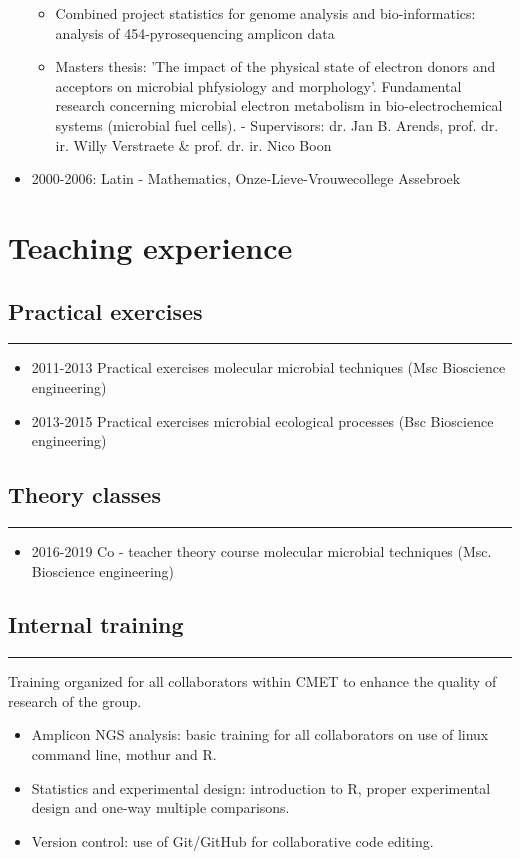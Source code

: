 \documentclass[a4paper,11pt,oneside]{article}
\begin{document}
\begin{itemize}
\begin{itemize}
		\item Combined project statistics for genome analysis and bio-informatics: analysis of 454-pyrosequencing amplicon data
		\item Masters thesis: 'The impact of the physical state of electron donors and acceptors on microbial phfysiology and morphology'. Fundamental research concerning microbial electron metabolism in bio-electrochemical systems (microbial fuel cells). - Supervisors: dr. Jan B. Arends, prof. dr. ir. Willy Verstraete \& prof. dr. ir. Nico Boon
	\end{itemize}
\item 2000-2006: Latin - Mathematics, Onze-Lieve-Vrouwecollege Assebroek
\end{itemize}



\section*{Teaching experience}
\subsection*{Practical exercises}
\rule{\textwidth}{1pt}
\begin{itemize}
  \item 2011-2013 Practical exercises molecular microbial techniques (Msc Bioscience engineering)
  \item 2013-2015 Practical exercises microbial ecological processes (Bsc Bioscience engineering)
\end{itemize}
\subsection*{Theory classes}
\rule{\textwidth}{1pt}
\begin{itemize}
  \item 2016-2019 Co - teacher theory course molecular microbial techniques (Msc. Bioscience engineering) 
\end{itemize}
\subsection*{Internal training}
\rule{\textwidth}{1pt}
Training organized for all collaborators within CMET to enhance the quality of research of the group.
\begin{itemize}
  \item Amplicon NGS analysis: basic training for all collaborators on use of linux command line, mothur and R.
  \item Statistics and experimental design: introduction to R, proper experimental design and one-way multiple comparisons.
  \item Version control: use of Git/GitHub for collaborative code editing.
\end{itemize}
\end{document}
